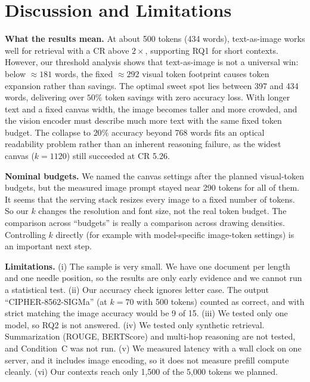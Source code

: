 \documentclass[conference]{IEEEtran}
\begin{document}
\section{Discussion and Limitations}
\label{sec:discussion}
\textbf{What the results mean.} At about 500 tokens (434 words), text-as-image works well for retrieval with a CR above $2\times$, supporting RQ1 for short contexts. However, our threshold analysis shows that text-as-image is not a universal win: below $\approx 181$ words, the fixed $\approx 292$ visual token footprint causes token expansion rather than savings. The optimal sweet spot lies between 397 and 434 words, delivering over $50\%$ token savings with zero accuracy loss. With longer text and a fixed canvas width, the image becomes taller and more crowded, and the vision encoder must describe much more text with the same fixed token budget. The collapse to $20\%$ accuracy beyond 768 words fits an optical readability problem rather than an inherent reasoning failure, as the widest canvas ($k=1120$) still succeeded at CR 5.26.

\textbf{Nominal budgets.} We named the canvas settings after the planned visual-token budgets, but the measured image prompt stayed near 290 tokens for all of them. It seems that the serving stack resizes every image to a fixed number of tokens. So our $k$ changes the resolution and font size, not the real token budget. The comparison across ``budgets'' is really a comparison across drawing densities. Controlling $k$ directly (for example with model-specific image-token settings) is an important next step.

\textbf{Limitations.} (i) The sample is very small. We have one document per length and one needle position, so the results are only early evidence and we cannot run a statistical test. (ii) Our accuracy check ignores letter case. The output ``CIPHER-8562-SIGMa'' (at $k=70$ with 500 tokens) counted as correct, and with strict matching the image accuracy would be 9 of 15. (iii) We tested only one model, so RQ2 is not answered. (iv) We tested only synthetic retrieval. Summarization (ROUGE, BERTScore) and multi-hop reasoning are not tested, and Condition~C was not run. (v) We measured latency with a wall clock on one server, and it includes image encoding, so it does not measure prefill compute cleanly. (vi) Our contexts reach only 1{,}500 of the 5{,}000 tokens we planned.
\end{document}
